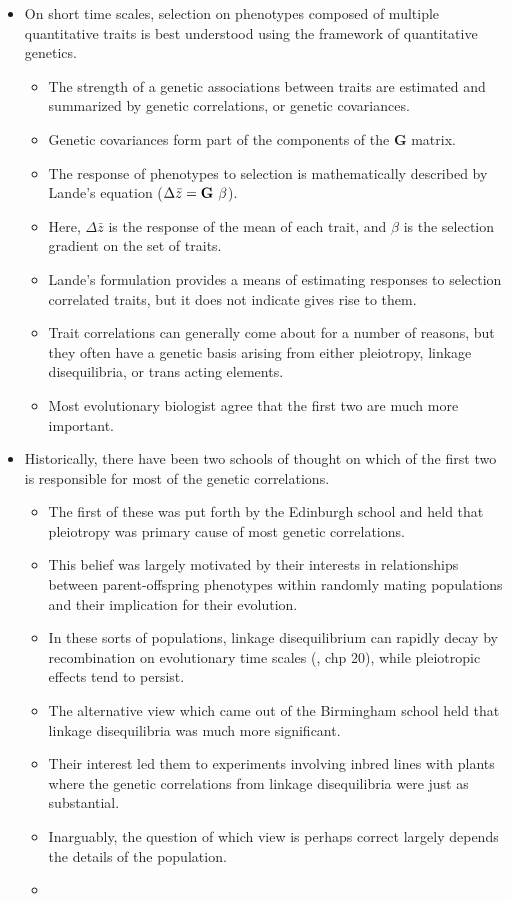 \documentclass[11pt,one column]{article}
\begin{document}
\begin{itemize}
\item On short time scales, selection on phenotypes composed of multiple quantitative traits is best understood using the framework of quantitative genetics. 
\begin{itemize}	
\item The strength of a genetic associations between traits are estimated and summarized by genetic correlations, or genetic covariances.
\item Genetic covariances form part of the components of the \textbf{G} matrix.
\item The response of phenotypes to selection is mathematically described by Lande's equation ($\Delta \bar{z} = \textbf{G} \hspace{.05in}\beta$).
\item Here, $\Delta \bar{z}$ is the response of the mean of each trait, and $\beta$ is the selection gradient on the set of traits. 
\item Lande’s formulation provides a means of estimating responses to selection correlated traits, but it does not indicate gives rise to them.
\item Trait correlations can generally come about for a number of reasons, but they often have a genetic basis \cite{Saltz2017} arising from either pleiotropy, linkage disequilibria, or trans acting elements.
\item Most evolutionary biologist agree that the first two are much more important.
\end{itemize}

\item Historically, there have been two schools of thought on which of the first two is responsible for most of the genetic correlations.
\begin{itemize} 
\item The first of these was put forth by the Edinburgh school and held that pleiotropy was primary cause of most genetic correlations.
\item This belief was largely motivated by their interests in relationships between parent-offspring phenotypes within randomly mating populations and their implication for their evolution.
\item In these sorts of populations, linkage disequilibrium can rapidly decay by recombination on evolutionary time scales (\cite{fox2006evolutionary}, chp 20), while pleiotropic effects tend to persist.
\item The alternative view which came out of the Birmingham school held that linkage disequilibria was much more significant.  
\item Their interest led them to experiments involving inbred lines with plants where the genetic correlations from linkage disequilibria were just as substantial.
\item Inarguably, the question of which view is perhaps correct largely depends the details of the population.
\item 
\end{itemize}


\end{itemize}
\end{document}
